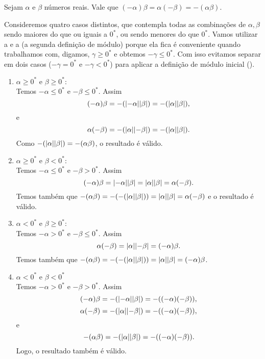 \documentclass[../main.tex]{subfiles}
\begin{document}
\begin{prop}\label{reais-teo-regraSinaisProduto1}
    Sejam $\alpha$ e $\beta$ números reais. Vale que $\left( - \alpha \right) \beta = \alpha \left( -\beta \right) = -\left(\alpha \beta \right) $.
\end{prop}
\begin{dem}
    Consideremos quatro casos distintos, que contempla todas as combinações de $\alpha, \beta$ sendo maiores do que ou iguais a $0^*$, ou sendo menores do que $0^*$. Vamos utilizar a  e a  (a segunda definição de módulo) porque ela fica é conveniente quando trabalhamos com, digamos, $\gamma \geq 0^*$ e obtemos $-\gamma \leq 0^*$. Com isso evitamos separar em dois casos ($-\gamma = 0^*$ e $-\gamma < 0^*$) para aplicar a definição de módulo inicial ().
    \begin{enumerate}
        \item $\alpha \geq 0^*$ e $\beta \geq 0^*$: \\
            Temos $-\alpha \leq 0^*$ e $-\beta \leq 0^*$. Assim
            \[ (-\alpha)\beta = -(\abs{-\alpha}\abs{\beta}) = -(\abs{\alpha}\abs{\beta}) ,\]
            e
            \[ \alpha(-\beta) = -(\abs{\alpha}\abs{-\beta}) = -(\abs{\alpha}\abs{\beta}). \]
            Como $-(\abs{\alpha}\abs{\beta}) = -(\alpha\beta)$, o resultado é válido.
        \item $\alpha \geq 0^*$ e $\beta < 0^*$: \\
            Temos $-\alpha \leq 0^*$ e $-\beta > 0^*$. Assim
            \[ (-\alpha)\beta = \abs{-\alpha}\abs{\beta} = \abs{\alpha}\abs{\beta} = \alpha(-\beta). \]
            Temos também que $-(\alpha \beta) = -(- (\abs{\alpha}\abs{\beta} )) = \abs{\alpha}\abs{\beta} = \alpha(-\beta)$ e o resultado é válido.   
        \item $\alpha < 0^*$ e $\beta \geq 0^*$: \\
            Temos $-\alpha > 0^*$ e $-\beta \leq 0^*$. Assim
            \[ \alpha(-\beta) = \abs{\alpha}\abs{-\beta} = (-\alpha)\beta. \]
            Temos também que $-(\alpha \beta) = -(- (\abs{\alpha}\abs{\beta} )) = \abs{\alpha}\abs{\beta} = (-\alpha)\beta$.       
        \item $\alpha < 0^*$ e $\beta < 0^*$ \\
            Temos $-\alpha > 0^*$ e $-\beta > 0^*$. Assim  
            \[ (-\alpha) \beta = -(\abs{-\alpha} \abs{\beta}) = -((-\alpha)(-\beta)), \]
            \[ \alpha (-\beta) = -(\abs{\alpha}  \abs{-\beta}) = -((-\alpha)(-\beta)), \]
            e
            \[ -(\alpha \beta) = -(\abs{\alpha}  \abs{\beta})  = -((-\alpha)(-\beta)).\]
            Logo, o resultado também é válido.
            
                     
    \end{enumerate}
\end{dem}
\end{document}
